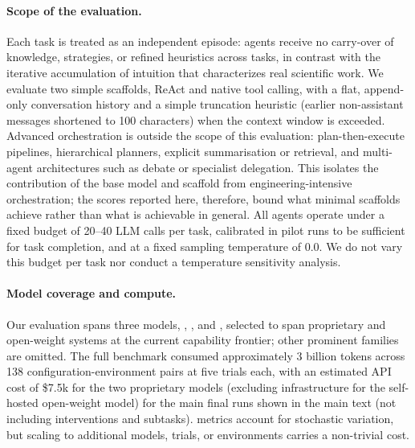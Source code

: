 \paragraph{Scope of the evaluation.}
Each task is treated as an independent episode: agents receive no carry-over of knowledge, strategies, or refined heuristics across tasks, in contrast with the iterative accumulation of intuition that characterizes real scientific work. We evaluate two simple scaffolds, ReAct and native tool calling, with a flat, append-only conversation history and a simple truncation heuristic (earlier non-assistant messages shortened to 100 characters) when the context window is exceeded. Advanced orchestration is outside the scope of this evaluation: plan-then-execute pipelines, hierarchical planners, explicit summarisation or retrieval, and multi-agent architectures such as debate or specialist delegation. This isolates the contribution of the base model and scaffold from engineering-intensive orchestration; the scores reported here, therefore, bound what minimal scaffolds achieve rather than what is achievable in general. All agents operate under a fixed budget of 20--40 LLM calls per task, calibrated in pilot runs to be sufficient for task completion, and at a fixed sampling temperature of $0.0$.
We do not vary this budget per task nor conduct a temperature sensitivity analysis.

\paragraph{Model coverage and compute.}
Our evaluation spans three models, \claudesonnet, \gptfourO, and \gptossfull, selected to span proprietary and open-weight systems at the current capability frontier; other prominent families are omitted. The full benchmark consumed approximately 3 billion tokens across 138 configuration-environment pairs at five trials each, with an estimated API cost of \$7.5k for the two proprietary models (excluding infrastructure for the self-hosted open-weight model) for the main final runs shown in the main text (not including interventions and subtasks). \passat metrics account for stochastic variation, but scaling to additional models, trials, or environments carries a non-trivial cost.

